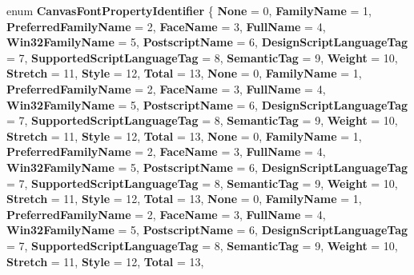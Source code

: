 \begin{DoxyCompactItemize}
enum {\bfseries Canvas\+Font\+Property\+Identifier} \{ \newline
{\bfseries None} = 0, 
{\bfseries Family\+Name} = 1, 
{\bfseries Preferred\+Family\+Name} = 2, 
{\bfseries Face\+Name} = 3, 
\newline
{\bfseries Full\+Name} = 4, 
{\bfseries Win32\+Family\+Name} = 5, 
{\bfseries Postscript\+Name} = 6, 
{\bfseries Design\+Script\+Language\+Tag} = 7, 
\newline
{\bfseries Supported\+Script\+Language\+Tag} = 8, 
{\bfseries Semantic\+Tag} = 9, 
{\bfseries Weight} = 10, 
{\bfseries Stretch} = 11, 
\newline
{\bfseries Style} = 12, 
{\bfseries Total} = 13, 
{\bfseries None} = 0, 
{\bfseries Family\+Name} = 1, 
\newline
{\bfseries Preferred\+Family\+Name} = 2, 
{\bfseries Face\+Name} = 3, 
{\bfseries Full\+Name} = 4, 
{\bfseries Win32\+Family\+Name} = 5, 
\newline
{\bfseries Postscript\+Name} = 6, 
{\bfseries Design\+Script\+Language\+Tag} = 7, 
{\bfseries Supported\+Script\+Language\+Tag} = 8, 
{\bfseries Semantic\+Tag} = 9, 
\newline
{\bfseries Weight} = 10, 
{\bfseries Stretch} = 11, 
{\bfseries Style} = 12, 
{\bfseries Total} = 13, 
\newline
{\bfseries None} = 0, 
{\bfseries Family\+Name} = 1, 
{\bfseries Preferred\+Family\+Name} = 2, 
{\bfseries Face\+Name} = 3, 
\newline
{\bfseries Full\+Name} = 4, 
{\bfseries Win32\+Family\+Name} = 5, 
{\bfseries Postscript\+Name} = 6, 
{\bfseries Design\+Script\+Language\+Tag} = 7, 
\newline
{\bfseries Supported\+Script\+Language\+Tag} = 8, 
{\bfseries Semantic\+Tag} = 9, 
{\bfseries Weight} = 10, 
{\bfseries Stretch} = 11, 
\newline
{\bfseries Style} = 12, 
{\bfseries Total} = 13, 
{\bfseries None} = 0, 
{\bfseries Family\+Name} = 1, 
\newline
{\bfseries Preferred\+Family\+Name} = 2, 
{\bfseries Face\+Name} = 3, 
{\bfseries Full\+Name} = 4, 
{\bfseries Win32\+Family\+Name} = 5, 
\newline
{\bfseries Postscript\+Name} = 6, 
{\bfseries Design\+Script\+Language\+Tag} = 7, 
{\bfseries Supported\+Script\+Language\+Tag} = 8, 
{\bfseries Semantic\+Tag} = 9, 
\newline
{\bfseries Weight} = 10, 
{\bfseries Stretch} = 11, 
{\bfseries Style} = 12, 
{\bfseries Total} = 13, 
\newline

\end{DoxyCompactItemize}
